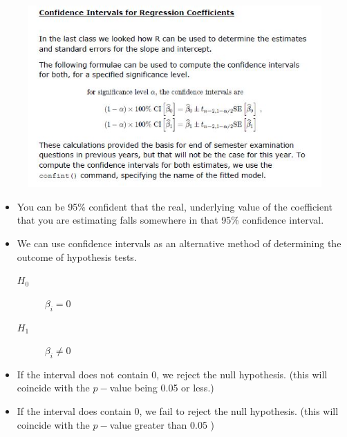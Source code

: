 \documentclass[a4paper,12pt]{article}
\begin{document}
\begin{figure}[h!]
	\centering
	\includegraphics[width=1.1\linewidth]{images/RegressionConfInt}
	
\end{figure}
\begin{itemize}
\item You can be 95\% confident that the real, underlying value of the coefficient that you are estimating falls somewhere in that 95\% confidence interval. 
\item We can use confidence intervals as an alternative method of determining the outcome of hypothesis tests.

	\begin{description}
		\item[ $H_0$] $\beta_i = 0 $
		\item[ $H_1$] $\beta_i \neq 0$
	\end{description}

\item If the interval does not contain 0, we reject the null hypothesis. 
(this will coincide with the $p-$value being 0.05 or less.)
\item If the interval does contain 0, we fail to reject the null hypothesis. 
(this will coincide with the $p-$value greater than 0.05 )
\end{itemize}
\newpage
\end{document}
